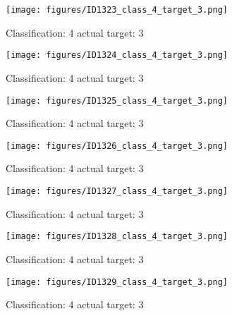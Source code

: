 \begin{figure}[h!]
\begin{center}
\texttt{[image: figures/ID1323\_class\_4\_target\_3.png]}
\end{center}
\caption{ Classification: 4 actual target: 3}
\label{fig:ID1323_class_4_target_3}
\end{figure}
\begin{figure}[h!]
\begin{center}
\texttt{[image: figures/ID1324\_class\_4\_target\_3.png]}
\end{center}
\caption{ Classification: 4 actual target: 3}
\label{fig:ID1324_class_4_target_3}
\end{figure}
\begin{figure}[h!]
\begin{center}
\texttt{[image: figures/ID1325\_class\_4\_target\_3.png]}
\end{center}
\caption{ Classification: 4 actual target: 3}
\label{fig:ID1325_class_4_target_3}
\end{figure}
\begin{figure}[h!]
\begin{center}
\texttt{[image: figures/ID1326\_class\_4\_target\_3.png]}
\end{center}
\caption{ Classification: 4 actual target: 3}
\label{fig:ID1326_class_4_target_3}
\end{figure}
\begin{figure}[h!]
\begin{center}
\texttt{[image: figures/ID1327\_class\_4\_target\_3.png]}
\end{center}
\caption{ Classification: 4 actual target: 3}
\label{fig:ID1327_class_4_target_3}
\end{figure}
\begin{figure}[h!]
\begin{center}
\texttt{[image: figures/ID1328\_class\_4\_target\_3.png]}
\end{center}
\caption{ Classification: 4 actual target: 3}
\label{fig:ID1328_class_4_target_3}
\end{figure}
\begin{figure}[h!]
\begin{center}
\texttt{[image: figures/ID1329\_class\_4\_target\_3.png]}
\end{center}
\caption{ Classification: 4 actual target: 3}
\label{fig:ID1329_class_4_target_3}
\end{figure}
